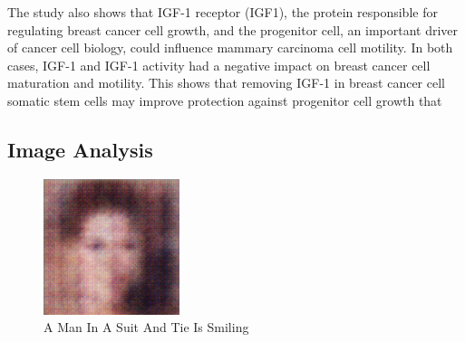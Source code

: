 \documentclass{article}%
\begin{document}
The study also shows that IGF{-}1 receptor (IGF1), the protein responsible for regulating breast cancer cell growth, and the progenitor cell, an important driver of cancer cell biology, could influence mammary carcinoma cell motility. In both cases, IGF{-}1 and IGF{-}1 activity had a negative impact on breast cancer cell maturation and motility. This shows that removing IGF{-}1 in breast cancer cell somatic stem cells may improve protection against progenitor cell growth that

%
\subsection{Image Analysis}%
\label{subsec:ImageAnalysis}%


\begin{figure}[h!]%
\centering%
\includegraphics[width=150px]{500_fake_images/samples_5_483.png}%
\caption{A Man In A Suit And Tie Is Smiling}%
\end{figure}

%
\end{document}
